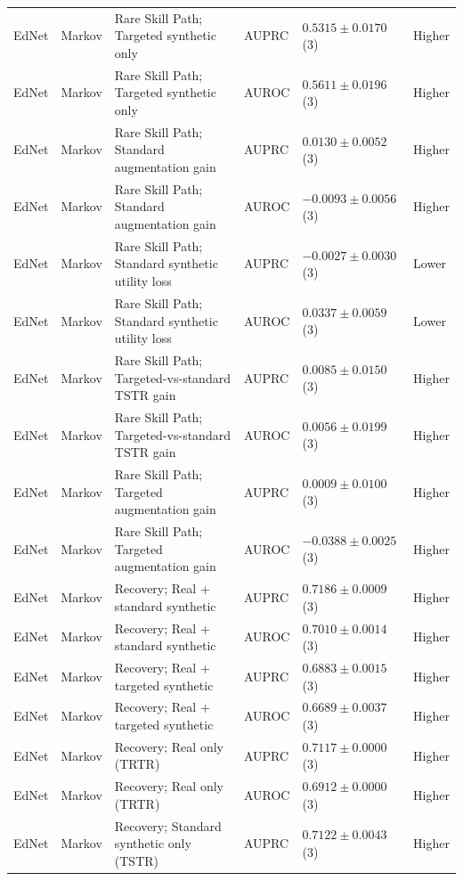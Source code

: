 \begin{longtable}{@{}p{2.25cm}p{2.05cm}p{4.7cm}p{5.0cm}p{2.6cm}p{1.25cm}@{}}
EdNet & Markov & Rare Skill Path; Targeted synthetic only & AUPRC & $0.5315 \mathbin{\pm} 0.0170$ (3) & Higher \\
EdNet & Markov & Rare Skill Path; Targeted synthetic only & AUROC & $0.5611 \mathbin{\pm} 0.0196$ (3) & Higher \\
EdNet & Markov & Rare Skill Path; Standard augmentation gain & AUPRC & $0.0130 \mathbin{\pm} 0.0052$ (3) & Higher \\
EdNet & Markov & Rare Skill Path; Standard augmentation gain & AUROC & $-0.0093 \mathbin{\pm} 0.0056$ (3) & Higher \\
EdNet & Markov & Rare Skill Path; Standard synthetic utility loss & AUPRC & $-0.0027 \mathbin{\pm} 0.0030$ (3) & Lower \\
EdNet & Markov & Rare Skill Path; Standard synthetic utility loss & AUROC & $0.0337 \mathbin{\pm} 0.0059$ (3) & Lower \\
EdNet & Markov & Rare Skill Path; Targeted-vs-standard TSTR gain & AUPRC & $0.0085 \mathbin{\pm} 0.0150$ (3) & Higher \\
EdNet & Markov & Rare Skill Path; Targeted-vs-standard TSTR gain & AUROC & $0.0056 \mathbin{\pm} 0.0199$ (3) & Higher \\
EdNet & Markov & Rare Skill Path; Targeted augmentation gain & AUPRC & $0.0009 \mathbin{\pm} 0.0100$ (3) & Higher \\
EdNet & Markov & Rare Skill Path; Targeted augmentation gain & AUROC & $-0.0388 \mathbin{\pm} 0.0025$ (3) & Higher \\
EdNet & Markov & Recovery; Real + standard synthetic & AUPRC & $0.7186 \mathbin{\pm} 0.0009$ (3) & Higher \\
EdNet & Markov & Recovery; Real + standard synthetic & AUROC & $0.7010 \mathbin{\pm} 0.0014$ (3) & Higher \\
EdNet & Markov & Recovery; Real + targeted synthetic & AUPRC & $0.6883 \mathbin{\pm} 0.0015$ (3) & Higher \\
EdNet & Markov & Recovery; Real + targeted synthetic & AUROC & $0.6689 \mathbin{\pm} 0.0037$ (3) & Higher \\
EdNet & Markov & Recovery; Real only (TRTR) & AUPRC & $0.7117 \mathbin{\pm} 0.0000$ (3) & Higher \\
EdNet & Markov & Recovery; Real only (TRTR) & AUROC & $0.6912 \mathbin{\pm} 0.0000$ (3) & Higher \\
EdNet & Markov & Recovery; Standard synthetic only (TSTR) & AUPRC & $0.7122 \mathbin{\pm} 0.0043$ (3) & Higher \\

\end{longtable}
